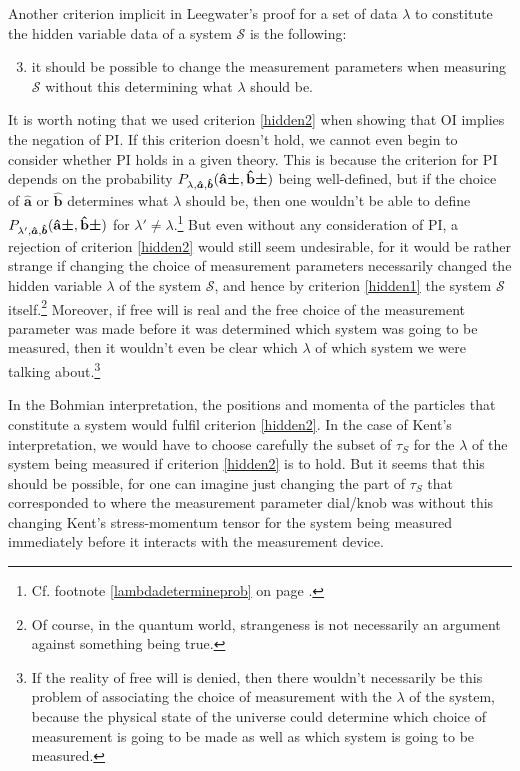 Another criterion implicit in Leegwater's proof for a set of data $\lambda$ to constitute the hidden variable data of a system $\mathcal{S}$ is the following: 
\begin{enumerate}
	\setcounter{enumi}{2}
\item \label{hidden2} it should be possible to change the measurement parameters when measuring $\mathcal{S}$ without this determining what $\lambda$ should be. 
\end{enumerate} 
It is worth noting that  we used criterion \ref{hidden2} when showing that OI implies the negation of PI. If this criterion doesn't hold, we cannot even begin to consider whether PI holds in a given theory. This is because the criterion for PI depends on the probability $P_{\lambda,\bm{\hat{a}},\bm{\hat{b}}}({\vb{\hat{{a}}}\bm{\pm}},{\vb{\hat{{b}}}\bm{\pm}})$ being well-defined, but if the choice of $\bm{\hat{a}}$ or $\bm{\hat{b}}$ determines what $\lambda$ should be, then one wouldn't be able to define $P_{\lambda',\bm{\hat{a}},\bm{\hat{b}}}({\vb{\hat{{a}}}\bm{\pm}},{\vb{\hat{{b}}}\bm{\pm}})$ for $\lambda'\neq\lambda$.\footnote{Cf. footnote \ref{lambdadetermineprob} on page \pageref{lambdadetermineprob}.} But even without any consideration of PI, a rejection of criterion \ref{hidden2} would still seem undesirable, for it would be rather strange if changing the choice of measurement parameters necessarily changed the hidden variable $\lambda$ of the system $\mathcal{S}$, and hence by criterion \ref{hidden1} the system $\mathcal{S}$ itself.\footnote{Of course, in the quantum world, strangeness is not necessarily an argument against something being true.} Moreover, if free will is real and the free choice of the measurement parameter was made before it was determined which system was going to be measured, then it wouldn't even be clear which $\lambda$ of which system we were talking about.\footnote{If the reality of free will is denied, then there wouldn't necessarily be this problem of associating the choice of measurement with the $\lambda$ of the system, because the physical state of the universe could determine which choice of measurement is going to be made as well as which system is going to be measured.}  

In the Bohmian interpretation, the positions and momenta of the particles that constitute a system would fulfil criterion \ref{hidden2}. In the case of Kent's interpretation, we would have to choose carefully the subset of $\tau_S$ for the $\lambda$ of the system being measured if criterion \ref{hidden2} is to hold. But it seems that this should be possible, for one can imagine just changing the part of $\tau_S$ that corresponded to where the measurement parameter dial/knob was without this changing Kent's stress-momentum tensor for the system being measured immediately before it interacts with the measurement device.   

